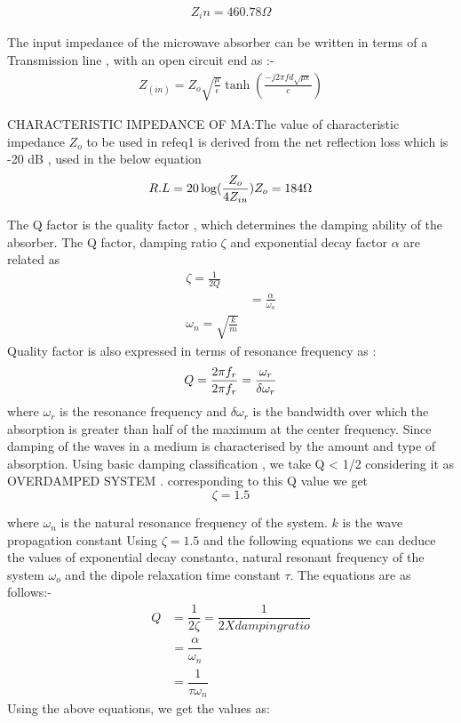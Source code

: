 \documentclass[journal]{IEEEtran}
\begin{document}
\begin{align}
Z_in = 460.78 \Omega  \label{v1}
\end{align} 

 The input impedance of the microwave absorber can be written in terms of a Transmission line , with an open circuit end as \cite{r2}:-
 \begin{align}
 Z_(in) = Z_o \sqrt{\frac{\mu }{\epsilon}} \tanh(\frac{-j2 \pi f d \sqrt{ \mu \epsilon}}{c}) \label{eq2}
 \end{align}
 
CHARACTERISTIC IMPEDANCE OF MA:The value of characteristic impedance $Z_o $ to be used in 
ref{eq1} is derived from the net reflection loss which is -20 dB , used in the below equation \cite{r1}
\begin{equation}
R.L = 20 \log(\frac{Z_o}{4Z_{in}}) \label{eq3} \\
Z_o = 184 \Omega  \\
\end{equation}

The Q factor is the quality factor , which determines the damping ability of the absorber\cite{r3}. The Q factor, damping ratio $\zeta$ and exponential decay factor $\alpha$ are related as \cite{r5}
\begin{align}
\zeta = \frac{1}{2Q} \\
 &= \frac{\alpha}{\omega_o} \label{two}\\
 \omega_n = \sqrt{\frac{k}{m}} \label{three}
\end{align}
Quality factor is also expressed in terms of resonance frequency as \cite{r2}:
$$   Q = \dfrac{2 \pi f_r}{2 \pi f_r} \label{four} \\
           = \dfrac{\omega_r}{\delta \omega_r}
$$ where $ \omega_r$ is the resonance frequency and $\delta \omega_r$ is the bandwidth over which the absorption is greater than half of the maximum at the center frequency.
Since damping of the waves in a medium is characterised by the amount and type of absorption. Using basic damping classification , we take Q < 1/2 considering it as OVERDAMPED SYSTEM \cite{r6} . corresponding to this Q value we get $$\zeta = 1.5 $$

where $\omega_n $ is the natural resonance frequency of the system. $k$ is the wave propagation constant
Using $\zeta=1.5 $ and the following equations we can deduce the values of exponential decay constant$\alpha$, natural resonant frequency of the system $\omega_o$ and the dipole relaxation time constant $\tau$. The equations are as follows:-
\begin{align}
 Q &= \dfrac{1}{2 \zeta} = \dfrac{1}{2 X damping ratio} \label{five}\\
   &= \dfrac{\alpha}{\omega_n} \label{six}\\
   &= \dfrac{1}{\tau \omega_n}
\end{align}
 Using the above equations, we get the values as:
 
\end{document}
